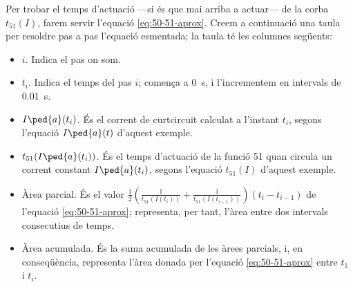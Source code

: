 \begin{exemple}
	Per trobar el temps d'actuació ---si és que mai arriba a actuar--- de la corba $t_{51}(I)$, farem servir l'equació \eqref{eq:50-51-aprox}.  	Creem a continuació una taula per resoldre pas a pas l'equació esmentada; la taula té les columnes següents:
	\begin{itemize}
		\item $i$. Indica el pas on som.
		\item $t_i$. Indica el temps del pas $i$; comença a \qty{0}{s}, i l'incrementem en intervals de  \qty{0,01}{s}.
		\item  $I\ped{a}(t_i)$. És el corrent de curtcircuit calculat a l'instant $t_i$, segons l'equació $I\ped{a}(t)$ d'aquest exemple.
		\item $t_{51}(I\ped{a}(t_i))$. És el temps d'actuació de la funció 51 quan circula un corrent constant $I\ped{a}(t_i)$, segons l'equació $t_{51}(I)$ d'aquest exemple.
		\item Àrea parcial. És el valor $\frac{1}{2} \left( \frac{1}{t_{51}(I(t_i))} + \frac{1}{t_{51}(I(t_{i-1}))} \right) (t_i - t_{i-1})$ de l'equació \eqref{eq:50-51-aprox}; representa, per tant, l'àrea entre dos intervals consecutius de temps.
		\item Àrea acumulada. És la suma acumulada de les àrees parcials, i, en conseqüència, representa l'àrea donada per l'equació \eqref{eq:50-51-aprox} entre $t_1$ i $t_i$.
	\end{itemize}
	

\end{exemple}
